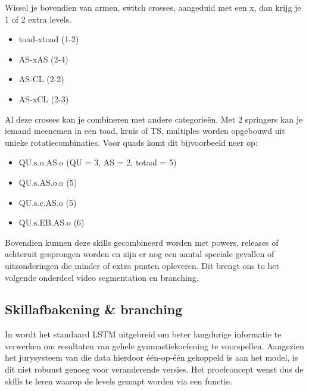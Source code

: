 Wissel je bovendien van armen, switch crosses, aangeduid met een x, dan krijg je 1 of 2 extra levels.

\begin{itemize}
    \item toad-xtoad (1-2)
    \item AS-xAS (2-4)
    \item AS-CL (2-2)
    \item AS-xCL (2-3)
\end{itemize}

Al deze crosses kan je combineren met andere categorieën. Met 2 springers kan je iemand meenemen in een toad, kruis of TS, multiples worden opgebouwd uit unieke rotatiecombinaties. Voor quads komt dit bijvoorbeeld neer op:
\begin{itemize}
    \item QU.s.o.AS.o (QU = 3, AS = 2, totaal = 5)
    \item QU.s.AS.o.o (5)
    \item QU.s.c.AS.o (5)
    \item QU.s.EB.AS.o (6)
\end{itemize}

Bovendien kunnen deze skills gecombineerd worden met powers, releases of achteruit gesprongen worden en zijn er nog een aantal speciale gevallen of uitzonderingen die minder of extra punten opleveren. Dit brengt ons to het volgende onderdeel video segmentation en branching.

\subsection{Skillafbakening \& branching}
\label{subsec:video segmentation & branching}

In \textcite{Zahan_2023} wordt het standaard LSTM uitgebreid om beter langdurige informatie te verwerken om resultaten van gehele gymnastiekoefening te voorspellen. Aangezien het jurysysteem van die data hierdoor één-op-één gekoppeld is aan het model, is dit niet robuust genoeg voor veranderende versies. Het proefconcept wenst dus de skills te leren waarop de levels gemapt worden via een functie.
    
